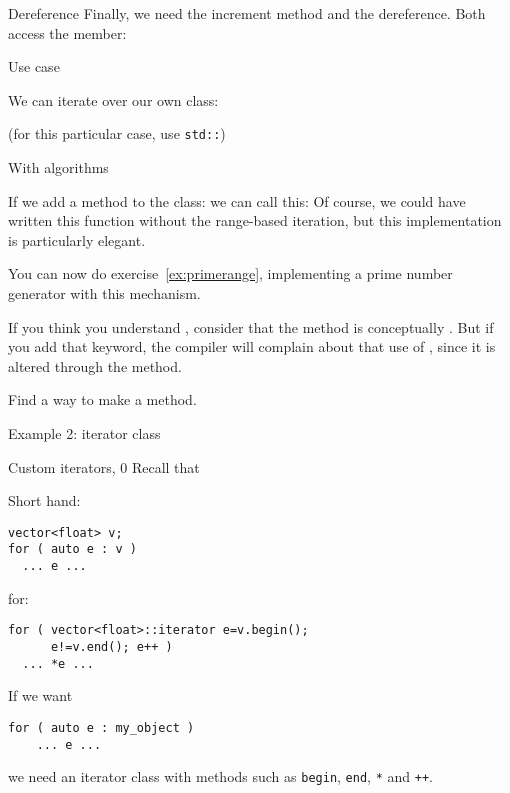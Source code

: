 \begin{block}{Dereference}
  \label{sl:bagderef}
  Finally, we need the increment method and the dereference. Both access
  the  member:
\end{block}

\begin{block}{Use case}
  \label{sl:bagfind}

  We can iterate over our own class:

  (for this particular case, use \lstinline{std::})
\end{block}

\begin{block}{With algorithms}
  \label{sl:bagany}

\end{block}

If we add a method  to the class:
%
%
we can call this:
%
%
Of course, we could have written this function
without the range-based iteration, but this implementation is
particularly elegant.

\begin{exercise}
  You can now do exercise~\ref{ex:primerange}, implementing a prime
  number generator with this mechanism.
\end{exercise}

If you think you understand , consider that the 
method is conceptually . But if you add that keyword, the
compiler will complain about that use of , since it is
altered through the  method.

\begin{exercise}
  \label{ex:rangeconstiter}
  Find a way to make  a  method.
\end{exercise}

 {Example 2: iterator class}

\begin{block}{Custom iterators, 0}
  \label{sl:it-class-0}
  Recall that
  \begin{multicols}{2}
    Short hand:
\begin{lstlisting}
vector<float> v;
for ( auto e : v )
  ... e ...
\end{lstlisting}
    \columnbreak for:
\begin{lstlisting}
for ( vector<float>::iterator e=v.begin();
      e!=v.end(); e++ )
  ... *e ...
\end{lstlisting}
  \end{multicols}
  If we want 
\begin{lstlisting}
for ( auto e : my_object )
    ... e ...
\end{lstlisting}
  we need an iterator class with methods such as
  \lstinline{begin}, \lstinline{end},
  \lstinline|*| and \lstinline|++|.
\end{block}

